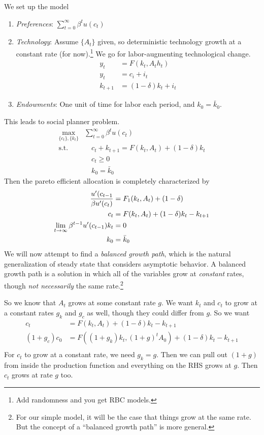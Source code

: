 \documentclass[12pt]{article}
\theoremstyle{plain}
\theoremstyle{definition}
\theoremstyle{remark}
\newcommand{\limt}{\lim_{t\rightarrow\infty}}
\newcommand{\sumtinfz}{\sum^\infty_{t=0}}
\begin{document}
We set up the model
\begin{enumerate}
  \item \emph{Preferences}: $\sumtinfz \beta^t u(c_t)$
  \item \emph{Technology}: Assume $\{A_t\}$ given, so deterministic
    technology growth at a constant rate (for now).\footnote{%
      Add randomness and you get RBC models.}
    We go for labor-augmenting technological change.
    \begin{align*}
      y_t &= F(k_t,A_th_t) \\
      y_t &= c_i + i_t \\
      k_{t+1} &= (1-\delta)k_t + i_t
    \end{align*}
  \item \emph{Endowments}: One unit of time for labor each period, and
    $k_0=\bar{k}_0$.
\end{enumerate}
This leads to social planner problem.
\begin{align*}
  \max_{\{c_t\},\{k_t\}}
    &\sumtinfz \beta^t u(c_t) \\
    \text{s.t.} &\quad
    c_t + k_{t+1}
    = F(k_t,A_t) + (1-\delta) k_t\\
    &\quad c_t \geq 0 \\
    &\quad k_0 = \bar{k}_0
\end{align*}
Then the pareto efficient allocation is completely characterized by
\begin{align}
  \frac{u'(c_{t-1}}{\beta u'(c_{t})}
  &= F_1(k_t,A_t) + (1-\delta) \label{eulerA}\\
  c_t &= F(k_t,A_t) + (1-\delta)k_t - k_{t+1}\notag\\
  \limt \beta^{t-1}u'(c_{t-1}) k_t &= 0 \notag\\
  k_0 &= \bar{k}_0\notag
\end{align}
We will now attempt to find a \emph{balanced growth path}, which is the
natural generalization of steady state that considers asymptotic
behavior. A balanced growth path is a solution in which all of the
variables grow at \emph{constant} rates, though \emph{not necessarily}
the same rate.\footnote{%
  For our simple model, it will be the case that things grow at the same
  rate. But the concept of a ``balanced growth path'' is more general.
}

So we know that $A_t$ grows at some constant rate $g$. We want $k_t$ and
$c_t$ to grow at a constant rates $g_k$ and $g_c$ as well, though they
could differ from $g$. So we want
\begin{align*}
  c_t &= F(k_t,A_t) + (1-\delta) k_t - k_{t+1} \\
  (1+g_c) c_0 &= F((1+g_k)k_t,(1+g)^tA_0) + (1-\delta) k_t - k_{t+1} \\
\end{align*}
For $c_t$ to grow at a constant rate, we need $g_k=g$. Then we can pull
out $(1+g)$ from inside the production function and everything on the
RHS grows at $g$. Then $c_t$ grows at rate $g$ too.
\end{document}
